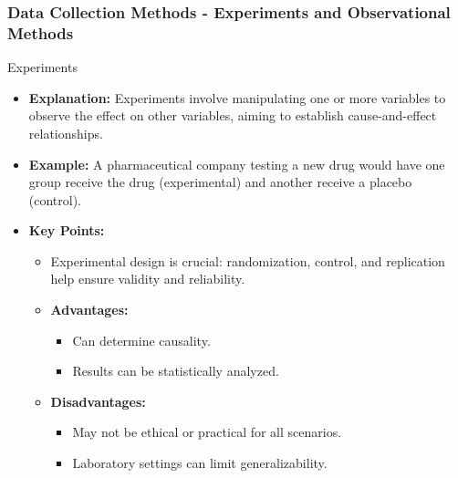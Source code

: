\documentclass[aspectratio=169]{beamer}
\begin{document}
\begin{frame}[fragile]
    \frametitle{Data Collection Methods - Experiments and Observational Methods}
    \begin{block}{Experiments}
        \begin{itemize}
            \item \textbf{Explanation:} Experiments involve manipulating one or more variables to observe the effect on other variables, aiming to establish cause-and-effect relationships.
            \item \textbf{Example:} A pharmaceutical company testing a new drug would have one group receive the drug (experimental) and another receive a placebo (control).
            \item \textbf{Key Points:}
            \begin{itemize}
                \item Experimental design is crucial: randomization, control, and replication help ensure validity and reliability.
                \item \textbf{Advantages:}
                \begin{itemize}
                    \item Can determine causality.
                    \item Results can be statistically analyzed.
                \end{itemize}
                \item \textbf{Disadvantages:}
                \begin{itemize}
                    \item May not be ethical or practical for all scenarios.
                    \item Laboratory settings can limit generalizability.
                \end{itemize}
            \end{itemize}
        \end{itemize}
    \end{block}
    

\end{frame}
\end{document}

